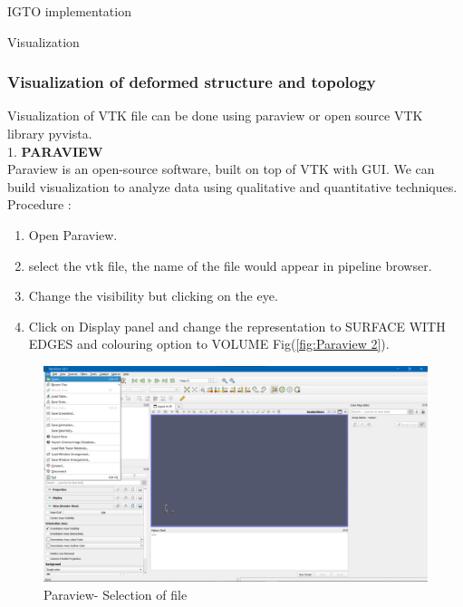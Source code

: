 \documentclass[a4paper,12pt,times]{article}
\begin{document}
\begin{section}{IGTO implementation}
\begin{subsection}{Visualization}
\subsubsection{Visualization of deformed structure and topology}
Visualization of VTK file can be done using paraview or open source VTK library pyvista.\\

1. \textbf{PARAVIEW}\\
Paraview is an open-source software, built on top of VTK with GUI. We can build visualization to analyze data using qualitative and quantitative techniques.\\
Procedure :
\begin{enumerate}
\item Open Paraview.
\item select the vtk file, the name of the file would appear in pipeline browser.
\item Change the visibility but clicking on the eye.
\item Click on Display panel and change the representation to SURFACE WITH EDGES and colouring option to VOLUME Fig(\ref{fig:Paraview 2}).
\end{enumerate}
\begin{figure}[h!]
\centering
\includegraphics[width=0.75\linewidth]{paraview.png}
\caption{Paraview- Selection of file}
\label{fig:Paraview 1}
\end{figure} 


\end{subsection}
\end{section}
\end{document}

